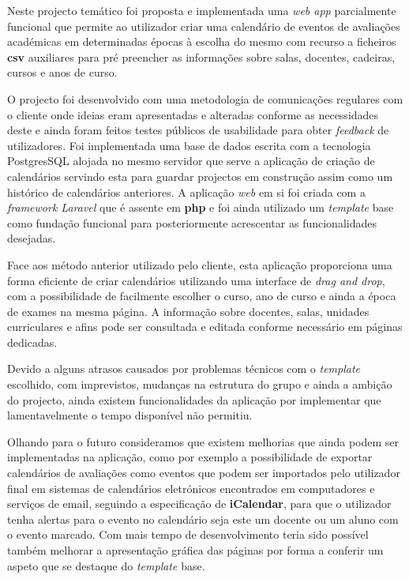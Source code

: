 \documentclass[11pt, twoside]{report}
\begin{document}
	Neste projecto temático foi proposta e implementada uma \textit{web app} parcialmente funcional que permite ao utilizador criar uma calendário de eventos de avaliações académicas em determinadas épocas à escolha do mesmo com recurso a ficheiros \textbf{csv} auxiliares para pré preencher as informações sobre salas, docentes, cadeiras, cursos e anos de curso.
	
	O projecto foi desenvolvido com uma metodologia de comunicações regulares com o cliente onde ideias eram apresentadas e alteradas conforme as necessidades deste e ainda foram feitos testes públicos de usabilidade para obter \textit{feedback} de utilizadores.
	Foi implementada uma base de dados escrita com a tecnologia PostgresSQL alojada no mesmo servidor que serve a aplicação de criação de calendários servindo esta para guardar projectos em construção assim como um histórico de calendários anteriores.
	A aplicação \textit{web} em si foi criada com a \textit{framework Laravel} que é assente em \textbf{php} e foi ainda utilizado um \textit{template} base como fundação funcional para posteriormente acrescentar as funcionalidades desejadas.
	
	Face aos método anterior utilizado pelo cliente, esta aplicação proporciona uma forma eficiente de criar calendários utilizando uma interface de \textit{drag and drop}, com a possibilidade de facilmente escolher o curso, ano de curso e ainda a época de exames na mesma página.
	A informação sobre docentes, salas, unidades curriculares e afins pode ser consultada e editada conforme necessário em páginas dedicadas.
	
	Devido a alguns atrasos causados por problemas técnicos com o \textit{template} escolhido, com imprevistos, mudanças na estrutura do grupo e ainda a ambição do projecto, ainda existem funcionalidades da aplicação por implementar que lamentavelmente o tempo disponível não permitiu.
	
	Olhando para o futuro consideramos que existem melhorias que ainda podem ser implementadas na aplicação, como por exemplo a possibilidade de exportar calendários de avaliações como eventos que podem ser importados pelo utilizador final em sistemas de calendários eletrónicos encontrados em computadores e serviços de email, seguindo a especificação de \textbf{iCalendar}\cite{rfc2445}\cite{1644111}, para que o utilizador tenha alertas para o evento no calendário seja este um docente ou um aluno com o evento marcado.
	Com mais tempo de desenvolvimento teria sido possível também melhorar a apresentação gráfica das páginas por forma a conferir um aspeto que se destaque do \textit{template} base.
	
\end{document}
